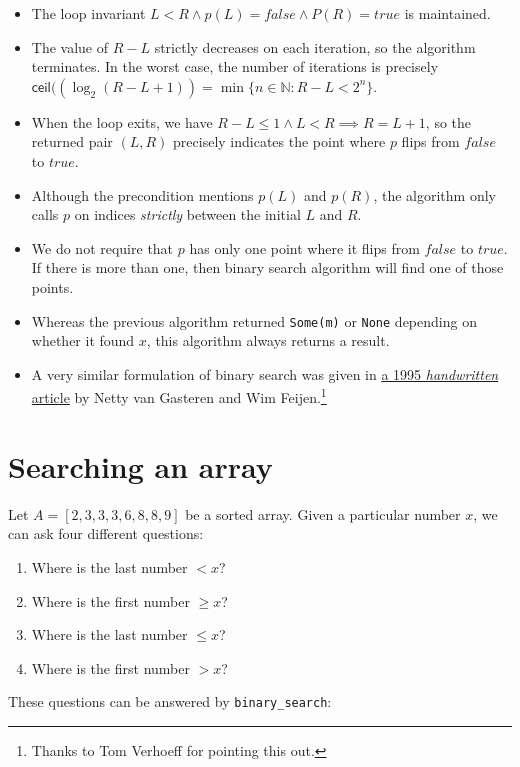 \documentclass[a4paper, 11pt]{article}
\begin{document}
\begin{itemize}
  \item The loop invariant $L<R \wedge p(L)=false \wedge P(R)=true$ is maintained.
  \item The value of $R - L$ strictly decreases on each iteration, so the algorithm terminates. In the worst case, the number of iterations is precisely $\mathsf{ceil}((\log_2(R - L + 1)) = \min \{n\in \mathbb{N} : R - L < 2^n\}$.
  \item When the loop exits, we have $R - L \leq 1 \wedge L < R \implies R = L+1$, so the returned pair $(L,R)$ precisely indicates the point where $p$ flips from $false$ to $true$.
  \item Although the precondition mentions $p(L)$ and $p(R)$, the algorithm only calls $p$ on indices \emph{strictly} between the initial $L$ and $R$.
  \item We do not require that $p$ has only one point where it flips from $false$ to $true$. If there is more than one, then binary search algorithm will find one of those points.
  \item Whereas the previous algorithm returned \lstinline|Some(m)| or \lstinline|None| depending on whether it found $x$, this algorithm always returns a result.
  \item A very similar formulation of binary search was given in \href{http://www.mathmeth.com/wf/files/wf2xx/wf214.pdf}{a 1995 \emph{handwritten} article} by Netty van Gasteren and Wim Feijen.\footnote{Thanks to Tom Verhoeff for pointing this out.}
\end{itemize}

\section{Searching an array}

Let $A = [2,3,3,3,6,8,8,9]$ be a sorted array. Given a particular number $x$, we can ask four different questions:

\begin{enumerate}[(Q1)]
  \item Where is the last number $<x$?
  \item Where is the first number $\geq x$?
  \item Where is the last number $\leq x$?
  \item Where is the first number $>x$?
\end{enumerate}

\noindent These questions can be answered by \lstinline|binary_search|:
\end{document}
